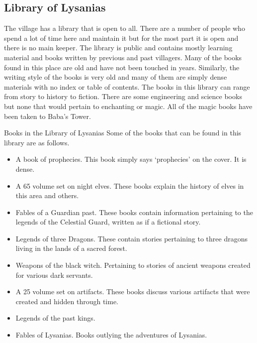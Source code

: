 \subsection{Library of Lysanias}

The village has a library that is open to all. There are a number of people who spend a lot of time here and maintain it but for the most part it is open and there is no main keeper. The library is public and contains mostly learning material and books written by previous and past villagers. Many of the books found in this place are old and have not been touched in years. Similarly, the writing style of the books is very old and many of them are simply dense materials with no index or table of contents. The books in this library can range from story to history to fiction. There are some engineering and science books but none that would pertain to enchanting or magic. All of the magic books have been taken to Baba's Tower.

\begin{commentbox}{Books in the Library of Lysanias}
	Some of the books that can be found in this library are as follows.
	\begin{itemize}
		\item A book of prophecies. This book simply says `prophecies' on the cover. It is dense.
		\item A 65 volume set on night elves. These books explain the history of elves in this area and others. 
		\item Fables of a Guardian past. These books contain information pertaining to the legends of the Celestial Guard, written as if a fictional story.
		\item Legends of three Dragons. These contain stories pertaining to three dragons living in the lands of a sacred forest.
		\item Weapons of the black witch. Pertaining to stories of ancient weapons created for various dark servants.
		\item A 25 volume set on artifacts. These books discuss various artifacts that were created and hidden through time.
		\item Legends of the past kings.
		\item Fables of Lysanias. Books outlying the adventures of Lysanias. 
	\end{itemize}
\end{commentbox}





